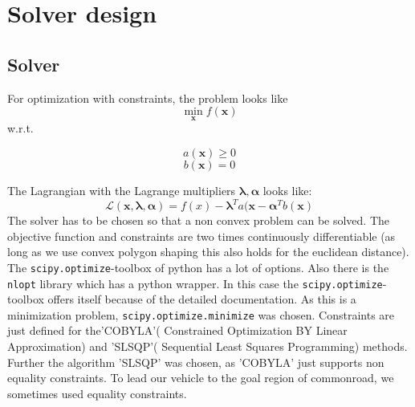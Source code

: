\documentclass[conference]{IEEEtran}
\begin{document}
\section{Solver design}
\subsection{Solver}
For optimization with constraints, the problem looks like 
\begin{equation}
\min_{\mathbf{x}} f(\mathbf{x})
\end{equation}
w.r.t.

$$a(\mathbf{x}) \geq 0$$
$$b(\mathbf{x}) = 0$$

The Lagrangian with the Lagrange multipliers $\mathbf{\lambda},\mathbf{\alpha}$ looks like:
\begin{equation}
\mathcal{L}(\mathbf{x},\mathbf{\lambda},\mathbf{\alpha}) = f(x) - \mathbf{\lambda}^T a(\mathbf{x} -\mathbf{\alpha}^T b (\mathbf{x})
\end{equation}
The solver has to be chosen so that a non convex problem can be solved. The objective function and constraints are two times continuously differentiable (as long as we use convex polygon shaping this also holds for the euclidean distance). The \texttt{scipy.optimize}-toolbox of python has a lot of options. Also there is the \texttt{nlopt} library which has a python wrapper. In this case the \texttt{scipy.optimize}-toolbox offers itself because of the detailed documentation.
 As this is a minimization problem, \texttt{scipy.optimize.minimize} was chosen. Constraints are just defined for the'COBYLA'( Constrained Optimization BY Linear Approximation) and 'SLSQP'( Sequential Least Squares Programming) methods. Further the algorithm 'SLSQP' was chosen, as 'COBYLA' just supports non equality constraints. To lead our vehicle to the goal region of commonroad, we sometimes used equality constraints.
\end{document}
